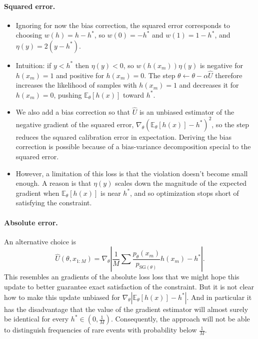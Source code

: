 \documentclass{article}
\begin{document}
\paragraph{Squared error.}
\begin{itemize}
    \item Ignoring for now the bias correction, the squared error corresponds to choosing $w(h) = h - h^*$, so $w(0) = -h^*$ and $w(1) = 1 - h^*$, and $\eta(y) = 2(y - h^*)$.
    \item Intuition: if $y < h^*$ then $\eta(y) < 0$, so $w(h(x_m))\eta(y)$ is negative for $h(x_m)=1$ and positive for $h(x_m)=0$. The step $\theta \leftarrow \theta - \alpha\hat U$ therefore increases the likelihood of samples with $h(x_m)=1$ and decreases it for $h(x_m)=0$, pushing $\mathbb{E}_\theta[h(x)]$ toward $h^*$.
    \item We also add a bias correction so that $\hat U$ is an unbiased estimator of the negative gradient of the squared error, $\nabla_\theta (\mathbb{E}_\theta[h(x)] - h^*)^2$, so the step reduces the squared calibration error in expectation. Deriving the bias correction is possible because of a bias-variance decomposition special to the squared error.
    \item However, a limitation of this loss is that the violation doesn't become small enough. A reason is that $\eta(y)$ scales down the magnitude of the expected gradient when $\mathbb{E}_\theta[h(x)]$ is near $h^*$, and so optimization stops short of satisfying the constraint.
\end{itemize}

\paragraph{Absolute error.}
An alternative choice is 
\[
    \hat U(\theta, x_{1:M}) = \nabla_\theta \left|\frac{1}{M}\sum \frac{p_{\theta}(x_m)}{p_{\mathrm{SG}(\theta)}} h(x_m) - h^*\right|.
\]
This resembles an gradients of the absolute loss loss that we might hope this update to better guarantee exact satisfaction of the constraint. But it is not clear how to make this update unbiased for $\nabla_\theta |\mathbb{E}_\theta[h(x)]-h^*|$. And in particular it has the disadvantage that the value of the gradient estimator will almost surely be identical for every $h^* \in (0, \frac{1}{M})$. Consequently, the approach will not be able to distinguish frequencies of rare events with probability below $\frac{1}{M}$.
\end{document}
